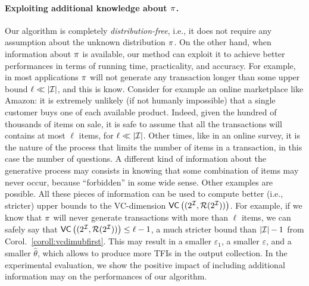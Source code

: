 \paragraph{Exploiting additional knowledge about $\pi$.} 
Our algorithm is completely \emph{distribution-free}, i.e., it does not require
any assumption about the unknown distribution $\pi$. On the other hand, when
information about $\pi$ is available, our method can exploit it to achieve
better performances in terms of running time, practicality, and accuracy. 
For example, in most applications $\pi$ will not generate any transaction
longer than some upper bound $\ell\ll|{\cal I}|$, and this is know. 
Consider for example an online
marketplace like Amazon: it is extremely unlikely (if not humanly impossible)
that a single customer buys one of each available product. Indeed, given the
hundred of thousands of items on sale, it is safe to assume that all the
transactions will contains at most $\ell$ items, for $\ell\ll|{\cal I}|$. Other
times, like in an online survey, it is the nature of the process that limits the
number of items in a transaction, in this case the number of questions. A
different kind of information about the generative process may consists in
knowing that some combination of items may never occur, because ``forbidden'' in
some wide sense. Other examples are possible. All these pieces of information
can be used to compute better (i.e., stricter) upper bounds to the VC-dimension
$\mathsf{VC}\left((2^{\cal I},\mathcal{R}(2^{\cal I}))\right)$. For example, if we know that $\pi$ will never generate
transactions with more than $\ell$ items, we can safely say that
$\mathsf{VC}\left((2^{\cal I},\mathcal{R}(2^{\cal I}))\right)\le \ell-1$, a much stricter bound than $|{\cal I}|-1$ from
Corol.~\ref{coroll:vcdimubfirst}. This may result in a smaller $\varepsilon_1$, a smaller 
$\varepsilon$, and a smaller $\hat\theta$, which allows to produce
more TFIs in the output collection. In the experimental evaluation, we show the
positive impact of including additional information may on the performances of
our algorithm.
\fi

